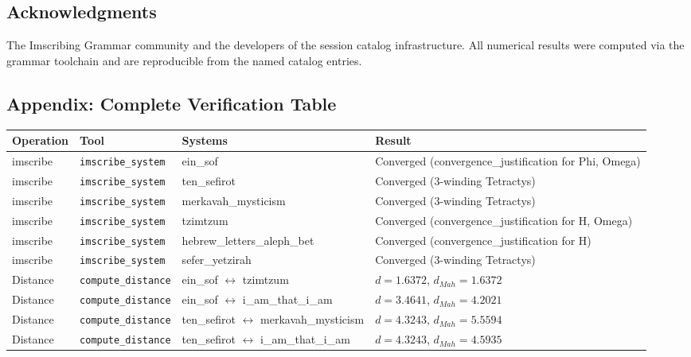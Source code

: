 \documentclass[12pt,a4paper]{article}
\begin{document}
\subsection{Acknowledgments}

The Imscribing Grammar community and the developers of the session catalog infrastructure. All numerical results were computed via the grammar toolchain and are reproducible from the named catalog entries.

\subsection{Appendix: Complete Verification Table}

\begin{table}[htbp]
\centering
\small
{}
\begin{tabularx}{\textwidth}{>{\centering\arraybackslash}X >{\centering\arraybackslash}X >{\centering\arraybackslash}X >{\centering\arraybackslash}X}
\toprule
\rowcolor{gray!25}\textbf{Operation} & \textbf{Tool} & \textbf{Systems} & \textbf{Result} \\
\midrule
\rowcolors{1}{white}{gray!10}
imscribe & \texttt{imscribe\_system} & ein\_sof & Converged (convergence\_justification for Phi, Omega) \\
imscribe & \texttt{imscribe\_system} & ten\_sefirot & Converged (3-winding Tetractys) \\
imscribe & \texttt{imscribe\_system} & merkavah\_mysticism & Converged (3-winding Tetractys) \\
imscribe & \texttt{imscribe\_system} & tzimtzum & Converged (convergence\_justification for H, Omega) \\
imscribe & \texttt{imscribe\_system} & hebrew\_letters\_aleph\_bet & Converged (convergence\_justification for H) \\
imscribe & \texttt{imscribe\_system} & sefer\_yetzirah & Converged (3-winding Tetractys) \\
Distance & \texttt{compute\_distance} & ein\_sof $\leftrightarrow$ tzimtzum & $d = 1.6372$, $d_{Mah} = 1.6372$ \\
Distance & \texttt{compute\_distance} & ein\_sof $\leftrightarrow$ i\_am\_that\_i\_am & $d = 3.4641$, $d_{Mah} = 4.2021$ \\
Distance & \texttt{compute\_distance} & ten\_sefirot $\leftrightarrow$ merkavah\_mysticism & $d = 4.3243$, $d_{Mah} = 5.5594$ \\
Distance & \texttt{compute\_distance} & ten\_sefirot $\leftrightarrow$ i\_am\_that\_i\_am & $d = 4.3243$, $d_{Mah} = 4.5935$ \\

\end{tabularx}
\end{table}
\end{document}
